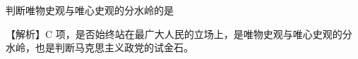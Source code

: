 \question 判断唯物史观与唯心史观的{分水岭}的是
\par{}
\begin{solution}【解析】C
项，是否始终站在最广大人民的立场上，是唯物史观与唯心史观的分水岭，也是判断马克思主义政党的试金石。
\end{solution}
